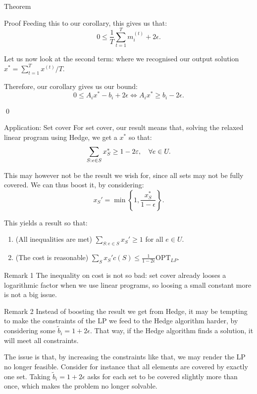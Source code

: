 \documentclass[a4paper]{article}
\begin{document}
\begin{parag}{Theorem}
\begin{subparag}{Proof}
        Feeding this to our corollary, this gives us that:  
        \[0 \leq \frac{1}{T} \sum_{t=1}^{T} m_i^{\left(t\right)} + 2\epsilon.\]

        Let us now look at the second term: 
        where we recognised our output solution $x^* = \sum_{t=1}^{T} x^{\left(t\right)}/T$.

        Therefore, our corollary gives us our bound: 
        \[0 \leq A_i x^* - b_i + 2\epsilon \iff A_i x^* \geq b_i - 2 \epsilon.\]
        
        \qed
    \end{subparag}
\end{parag}

\begin{parag}{Application: Set cover}
    For set cover, our result means that, solving the relaxed linear program using Hedge, we get a $x^*$ so that: 
    \[\sum_{S : e \in S} x_S^* \geq 1 - 2 \varepsilon, \quad \forall e \in U.\]

    This may however not be the result we wish for, since all sets may not be fully covered. We can thus boost it, by considering: 
    \[x_S' = \min\left\{1, \frac{x_S^*}{1 - \epsilon}\right\}.\]

    This yields a result so that:
    \begin{enumerate}
        \item (All inequalities are met) $\displaystyle \sum_{S : e \in S} x_S' \geq 1$ for all $e \in U$.
        \item (The cost is reasonable) $\displaystyle \sum_{S} x_S' c\left(S\right) \leq \frac{1}{1 - 2\epsilon} \text{OPT}_{LP}$.
    \end{enumerate}

    \begin{subparag}{Remark 1}
        The inequality on cost is not so bad: set cover already looses a logarithmic factor when we use linear programs, so loosing a small constant more is not a big issue.
    \end{subparag}
    
    \begin{subparag}{Remark 2}
        Instead of boosting the result we get from Hedge, it may be tempting to make the constraints of the LP we feed to the Hedge algorithm harder, by considering some $\widetilde{b}_i = 1 + 2 \epsilon$. That way, if the Hedge algorithm finds a solution, it will meet all constraints.

        The issue is that, by increasing the constraints like that, we may render the LP no longer feasible. Consider for instance that all elements are covered by exactly one set. Taking $\widetilde{b}_i = 1 + 2 \epsilon$ asks for each set to be covered slightly more than once, which makes the problem no longer solvable.
    \end{subparag}
\end{parag}
\end{document}
